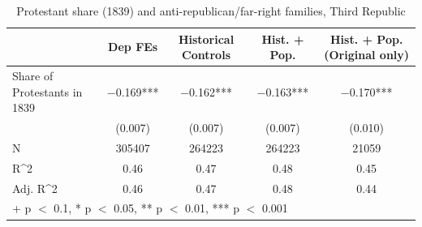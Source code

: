 \begin{table}
\centering
\caption{Protestant share (1839) and anti-republican/far-right families, Third Republic}
\centering
\begin{tabular}[t]{lcccc}
\toprule
  & Dep FEs & Historical Controls & Hist. + Pop. & Hist. + Pop. (Original only)\\
\midrule
Share of Protestants in 1839 & \num{-0.169}*** & \num{-0.162}*** & \num{-0.163}*** & \num{-0.170}***\\
 & (\num{0.007}) & (\num{0.007}) & (\num{0.007}) & (\num{0.010})\\
\midrule
N & \num{305407} & \num{264223} & \num{264223} & \num{21059}\\
R\textasciicircum{}2 & \num{0.46} & \num{0.47} & \num{0.48} & \num{0.45}\\
Adj. R\textasciicircum{}2 & \num{0.46} & \num{0.47} & \num{0.48} & \num{0.44}\\
\bottomrule
\multicolumn{5}{l}{\rule{0pt}{1em}+ p $<$ 0.1, * p $<$ 0.05, ** p $<$ 0.01, *** p $<$ 0.001}\\
\end{tabular}
\end{table}
